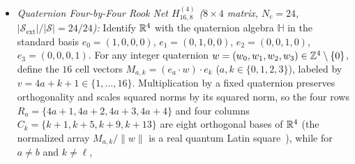 \documentclass[aps,pra,reprint,superscriptaddress,longbibliography,nofootinbib,floatfix,10pt]{revtex4-2}
\theoremstyle{definition}\newtheorem{definition}[theorem]{Definition}
\theoremstyle{remark}\newtheorem{remark}[theorem]{Remark}
\newcommand{\Sc}{\mathcal S}\newcommand{\Cc}{\mathcal C}
\begin{document}
\begin{itemize}
\[
\begin{aligned}
C_1&=\{1,2,4,3\},\ C_2=\{5,8,7,6\},\ C_3=\{4,9,10,8\},\\
C_4&=\{11,1,12,5\},\ C_5=\{11,14,13,2\},\\
C_6&=\{15,3,16,7\},\ C_7=\{15,17,18,6\}.
\end{aligned}
\]
Why can $11$ and $15$ never share a column in a $7\times 4$ matrix (or even a single state column)? If $11,15\in\mathbf{c}_0$, then Rows~$4,5,6,7$ bar $\{1,2,3\}$ and $\{5,6,7\}$ from $\mathbf{c}_0$; then Row~1 ($\{1,2,4,3\}$) forces $4\in\mathbf{c}_0$ and Row~2 ($\{5,8,7,6\}$) forces $8\in\mathbf{c}_0$, so $4$ and $8$ collide in Column~$\mathbf{c}_0$ of Row~3 ($\{4,9,10,8\}$)! In $L_{22,9}^{(4)}$, adjoining $C_8=\{11,21,22,19\}$ and $C_9=\{13,20,15,19\}$ whose listed context $C_9$ includes the pair $\{13,15\}$ ensures that $\{11,13,15,19\}$ occupy all four distinct columns, locking $20\in C_9$ into the column of $11$ ($11\sim_c 20$). An explicit $9\times 4$ Context--Color Matrix (with its first context fixed as $(1,2,3,4)$) is:
\begin{equation}\label{eq:L22-matrix}
M_1^{(L_{22,9}^{(4)})}=\begin{pmatrix}
\mathbf{c}_0 & \mathbf{c}_1 & \mathbf{c}_2 & \mathbf{c}_3\\\hline
1 & 2 & 3 & 4\\
7 & 5 & 8 & 6\\
9 & 10 & 8 & 4\\
1 & 5 & \mathbf{11} & 12\\
13 & 2 & \mathbf{11} & 14\\
7 & 15 & 3 & 16\\
17 & 15 & 18 & 6\\
21 & 22 & \mathbf{11} & 19\\
13 & 15 & \mathbf{20} & 19
\end{pmatrix}.
\end{equation}
Notice how Column~$\mathbf{c}_2$ in Eq.~\eqref{eq:L22-matrix} locks $\mathbf{11}$ (in Rows~$4,5,8$) and $\mathbf{20}$ (in Row~$9$) into the same state column $S_2=\{3,8,11,18,20\}$.
\item \emph{Quaternion Four-by-Four Rook Net $H_{16,8}^{(4)}$ ($8\times 4$ matrix, $N_c=24$, $|\Sc_{\mathrm{ext}}|/|\Sc|=24/24$):} Identify $\mathbb R^4$ with the quaternion algebra $\mathbb H$ in the standard basis $e_0=(1,0,0,0)$, $e_1=(0,1,0,0)$, $e_2=(0,0,1,0)$, $e_3=(0,0,0,1)$. For any integer quaternion $w=(w_0,w_1,w_2,w_3)\in\mathbb Z^4\setminus\{0\}$, define the $16$ cell vectors $M_{a,k}=(e_a\cdot w)\cdot e_k$ ($a,k\in\{0,1,2,3\}$), labeled by $v=4a+k+1\in\{1,\ldots,16\}$. Multiplication by a fixed quaternion preserves orthogonality and scales squared norms by its squared norm, so the four rows $R_a=\{4a+1,4a+2,4a+3,4a+4\}$ and four columns $C_k=\{k+1,k+5,k+9,k+13\}$ are eight orthogonal bases of $\mathbb R^4$ (the normalized array $M_{a,k}/\|w\|$ is a real quantum Latin square~\cite{musto2016quantum}), while for $a\ne b$ and $k\ne\ell$,

\end{itemize}
\end{document}
